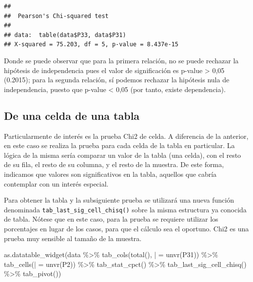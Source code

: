 \documentclass[
]{book}
\newenvironment{Shaded}{\begin{snugshade}}{\end{snugshade}}
\newcommand{\AttributeTok}[1]{\textcolor[rgb]{0.77,0.63,0.00}{#1}}
\newcommand{\FunctionTok}[1]{\textcolor[rgb]{0.00,0.00,0.00}{#1}}
\newcommand{\NormalTok}[1]{#1}
\newcommand{\OtherTok}[1]{\textcolor[rgb]{0.56,0.35,0.01}{#1}}
\newcommand{\SpecialCharTok}[1]{\textcolor[rgb]{0.00,0.00,0.00}{#1}}
\newcommand{\StringTok}[1]{\textcolor[rgb]{0.31,0.60,0.02}{#1}}
\begin{document}
\begin{Shaded}
\end{Shaded}

\begin{verbatim}
## 
##  Pearson's Chi-squared test
## 
## data:  table(data$P33, data$P31)
## X-squared = 75.203, df = 5, p-value = 8.437e-15
\end{verbatim}

Donde se puede observar que para la primera relación, no se puede rechazar la hipótesis de independencia pues el valor de significación es p-value \textgreater{} 0,05 (0.2015); para la segunda relación, sí podemos rechazar la hipótesis nula de independencia, puesto que p-value \textless{} 0,05 (por tanto, existe dependencia).

\hypertarget{de-una-celda-de-una-tabla}{%
\subsection{De una celda de una tabla}\label{de-una-celda-de-una-tabla}}

Particularmente de interés es la prueba Chi2 de celda. A diferencia de la anterior, en este caso se realiza la prueba para cada celda de la tabla en particular. La lógica de la misma sería comparar un valor de la tabla (una celda), con el resto de su fila, el resto de su columna, y el resto de la muestra. De este forma, indicamos que valores son significativos en la tabla, aquellos que cabría contemplar con un interés especial.

Para obtener la tabla y la subsiguiente prueba se utilizará una nueva función denominada \texttt{tab\_last\_sig\_cell\_chisq()} sobre la misma estructura ya conocida de tabla. Nótese que en este caso, para la prueba se requiere utilizar los porcentajes en lugar de los casos, para que el cálculo sea el oportuno. Chi2 es una prueba muy sensible al tamaño de la muestra.

\begin{Shaded}
\begin{Highlighting}[]
\FunctionTok{as.datatable\_widget}\NormalTok{(data }\SpecialCharTok{\%\textgreater{}\%} \FunctionTok{tab\_cols}\NormalTok{(}\FunctionTok{total}\NormalTok{(), }\StringTok{\textasciigrave{}}\AttributeTok{|}\StringTok{\textasciigrave{}} \OtherTok{=} \FunctionTok{unvr}\NormalTok{(P31)) }\SpecialCharTok{\%\textgreater{}\%} 
  \FunctionTok{tab\_cells}\NormalTok{(}\StringTok{\textasciigrave{}}\AttributeTok{|}\StringTok{\textasciigrave{}} \OtherTok{=} \FunctionTok{unvr}\NormalTok{(P2)) }\SpecialCharTok{\%\textgreater{}\%} \FunctionTok{tab\_stat\_cpct}\NormalTok{() }\SpecialCharTok{\%\textgreater{}\%} \FunctionTok{tab\_last\_sig\_cell\_chisq}\NormalTok{() }\SpecialCharTok{\%\textgreater{}\%} 
  \FunctionTok{tab\_pivot}\NormalTok{())}
\end{Highlighting}
\end{Shaded}
\end{document}
